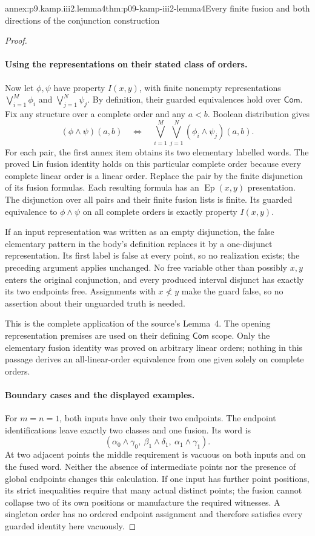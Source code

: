 \begin{annexitem}{annex:p9.kamp.iii2.lemma4}{thm:p09-kamp-iii2-lemma4}{Every finite fusion and both directions of the conjunction construction}
\begin{proof}
\paragraph{Using the representations on their stated class of orders.}
Now let \(\phi,\psi\) have property \(I(x,y)\), with finite
nonempty representations \(\bigvee_{i=1}^{M}\phi_i\) and
\(\bigvee_{j=1}^{N}\psi_j\). By definition, their guarded
equivalences hold over \(\mathsf{Com}\). Fix any structure over a
complete order and any \(a<b\). Boolean distribution gives
\[
 (\phi\land\psi)(a,b)
 \quad\Longleftrightarrow\quad
             \bigvee_{i=1}^{M}\bigvee_{j=1}^{N}
                         (\phi_i\land\psi_j)(a,b).
\]
For each pair, the first annex item obtains its two elementary labelled
words. The proved \(\mathsf{Lin}\) fusion identity holds on this
particular complete order because every complete linear order is a
linear order. Replace the pair by the finite disjunction of its fusion
formulas. Each resulting formula has an
\(\operatorname{Ep}(x,y)\) presentation. The disjunction over all
pairs and their finite fusion lists is finite. Its guarded equivalence
to \(\phi\land\psi\) on all complete orders is exactly property
\(I(x,y)\).

If an input representation was written as an empty disjunction, the
false elementary pattern in the body's definition replaces it by a
one-disjunct representation. Its first label is false at every point,
so no realization exists; the preceding argument applies unchanged.
No free variable other than possibly \(x,y\) enters the original
conjunction, and every produced interval disjunct has exactly its two
endpoints free. Assignments with \(x\not<y\) make the guard false,
so no assertion about their unguarded truth is needed.

This is the complete application of the source's Lemma~4. The opening
representation premises are used on their defining \(\mathsf{Com}\)
scope. Only the elementary fusion identity was proved on arbitrary
linear orders; nothing in this passage derives an all-linear-order
equivalence from one given solely on complete orders.

\paragraph{Boundary cases and the displayed examples.}
For \(m=n=1\), both inputs have only their two endpoints. The endpoint
identifications leave exactly two classes and one fusion. Its word is
\[
        (\alpha_0\land\gamma_0,\
           \beta_1\land\delta_1,\ \alpha_1\land\gamma_1).
\]
At two adjacent points the middle requirement is vacuous on both inputs
and on the fused word. Neither the absence of intermediate points nor
the presence of global endpoints changes this calculation. If one
input has further point positions, its strict inequalities require
that many actual distinct points; the fusion cannot collapse two of
its own positions or manufacture the required witnesses. A singleton
order has no ordered endpoint assignment and therefore satisfies every
guarded identity here vacuously.


\end{proof}
\end{annexitem}
